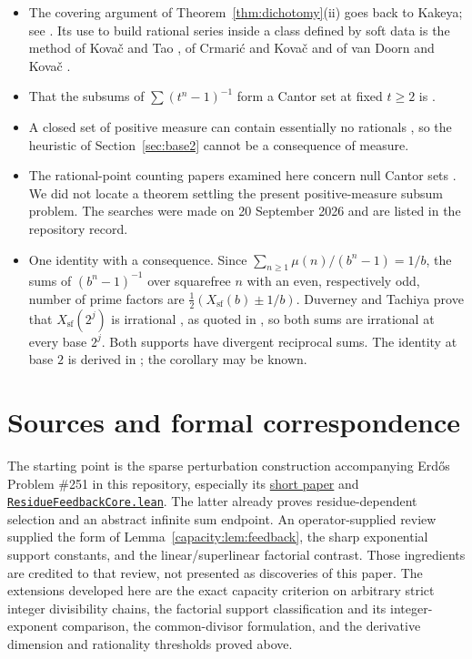 \documentclass[11pt]{article}
\begin{document}
\begin{itemize}
\item The covering argument of Theorem~\ref{thm:dichotomy}(ii) goes back to Kakeya; see
  \cite{hornich1941,nitecki2013,fridy1966}.  Its use to build rational series
  inside a class defined by soft data is the method of Kova\v{c} and Tao
  \cite{kovactao2024}, of Crmari\'{c} and Kova\v{c} \cite{crmarickovac2025} and
  of van Doorn and Kova\v{c} \cite{vandoornkovac2025}.
\item That the subsums of $\sum(t^n-1)^{-1}$ form a Cantor set at fixed
  $t\ge2$ is \cite[Remark~4.1]{kovactao2024}.
\item A closed set of positive measure can contain essentially no rationals
  \cite{boesdarsterdos1981}, so the heuristic of Section~\ref{sec:base2} cannot be
  a consequence of measure.
\item The rational-point counting papers examined here concern null Cantor
  sets \cite{rstw2019,chowvarjuyu2024}.  We did not locate a theorem settling
  the present positive-measure subsum problem.  The searches were made on
  20 September 2026 and are listed in the repository record.
\item One identity with a consequence.  Since
  $\sum_{n\ge1}\mu(n)/(b^n-1)=1/b$, the sums of $(b^n-1)^{-1}$ over squarefree
  $n$ with an even, respectively odd, number of prime factors are
  $\tfrac12(X_{\mathrm{sf}}(b)\pm1/b)$.  Duverney and Tachiya prove that
  $X_{\mathrm{sf}}(2^j)$ is irrational \cite[Corollary~1.2 and
  Example~1.1]{duverneytachiya}, as quoted in \cite[Section~6]{plectis257}, so
  both sums are irrational at every base $2^j$.  Both supports have divergent
  reciprocal sums.  The identity at base $2$ is derived in
  \cite[Section~5]{plectis249}; the corollary may be known.
\end{itemize}


\section{Sources and formal correspondence}\label{capacity:sec:sources}
The starting point is the sparse perturbation construction accompanying
Erd\H{o}s Problem \#251 in this repository, especially its
\href{erdos-251-prime-gap-dyadic-series.pdf}{short paper} and
\href{\repobase/lean/ErdosProblems/Erdos251/ResidueFeedbackCore.lean}{\texttt{ResidueFeedbackCore.lean}}.
The latter already proves residue-dependent selection and an abstract infinite
sum endpoint. An operator-supplied review supplied the form of
Lemma~\ref{capacity:lem:feedback}, the sharp exponential support constants, and the
linear/superlinear factorial contrast. Those ingredients are credited to that
review, not presented as discoveries of this paper. The extensions developed here are the exact capacity criterion on arbitrary
strict integer divisibility chains, the factorial support classification and
its integer-exponent comparison, the common-divisor formulation, and the
derivative dimension and rationality thresholds proved above.
\end{document}
